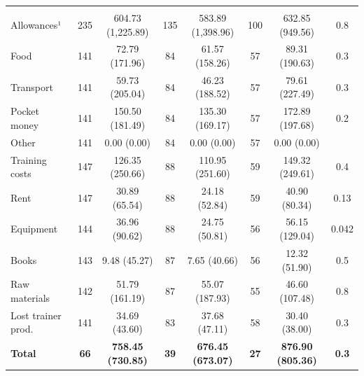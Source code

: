 \documentclass[
  11pt,
a4paper
]{article}
\begin{document}
\begin{table}[H]
{\begin{threeparttable}
\begin{tabular}[t]{lccccccc}
\addlinespace[0.3em]
\multicolumn{8}{l}{\textbf{Costs}}\\
\hspace{1em}Allowances¹ & 235 & 604.73 (1,225.89) & 135 & 583.89 (1,398.96) & 100 & 632.85 (949.56) & 0.8\\
\hspace{1em}\hspace{1em}Food & 141 & 72.79 (171.96) & 84 & 61.57 (158.26) & 57 & 89.31 (190.63) & 0.3\\
\hspace{1em}\hspace{1em}Transport & 141 & 59.73 (205.04) & 84 & 46.23 (188.52) & 57 & 79.61 (227.49) & 0.3\\
\hspace{1em}\hspace{1em}Pocket money & 141 & 150.50 (181.49) & 84 & 135.30 (169.17) & 57 & 172.89 (197.68) & 0.2\\
\hspace{1em}\hspace{1em}Other & 141 & 0.00 (0.00) & 84 & 0.00 (0.00) & 57 & 0.00 (0.00) & \\
\hspace{1em}Training costs & 147 & 126.35 (250.66) & 88 & 110.95 (251.60) & 59 & 149.32 (249.61) & 0.4\\
\hspace{1em}\hspace{1em}Rent & 147 & 30.89 (65.54) & 88 & 24.18 (52.84) & 59 & 40.90 (80.34) & 0.13\\
\hspace{1em}\hspace{1em}Equipment & 144 & 36.96 (90.62) & 88 & 24.75 (50.81) & 56 & 56.15 (129.04) & 0.042\\
\hspace{1em}\hspace{1em}Books & 143 & 9.48 (45.27) & 87 & 7.65 (40.66) & 56 & 12.32 (51.90) & 0.5\\
\hspace{1em}\hspace{1em}Raw materials & 142 & 51.79 (161.19) & 87 & 55.07 (187.93) & 55 & 46.60 (107.48) & 0.8\\
\hspace{1em}Lost trainer prod. & 141 & 34.69 (43.60) & 83 & 37.68 (47.11) & 58 & 30.40 (38.00) & 0.3\\
\textbf{\hspace{1em}Total} & \textbf{66} & \textbf{758.45 (730.85)} & \textbf{39} & \textbf{676.45 (673.07)} & \textbf{27} & \textbf{876.90 (805.36)} & \textbf{0.3}\\

\end{tabular}
\end{threeparttable}}
\end{table}
\end{document}
